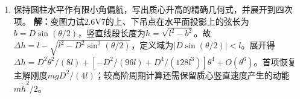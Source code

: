 \documentclass[UTF8,fontset=fandol,a4paper,11pt]{ctexart}
\begin{document}
\begin{enumerate}
\item 保持圆柱水平作有限小角偏航，写出质心升高的精确几何式，并展开到四次项。
\textbf{解：}变图力试2.6V7的上、下吊点在水平面投影上的弦长为$b=D\sin(\theta/2)$，竖直线段长度为$h=\sqrt{l^2-b^2}$。故$\Delta h=l-\sqrt{l^2-D^2\sin^2(\theta/2)}$，定义域为$|D\sin(\theta/2)|<l$。展开得$\Delta h=D^2\theta^2/(8l)+[-D^2/(96l)+D^4/(128l^3)]\theta^4+O(\theta^6)$。首项恢复主解刚度$mgD^2/(4l)$；较高阶周期计算还需保留质心竖直速度产生的动能$m\dot h^2/2$。
\begin{center}\begin{minipage}{.98\linewidth}\centering
{}
\end{minipage}
\end{center}
\end{enumerate}
\end{document}
